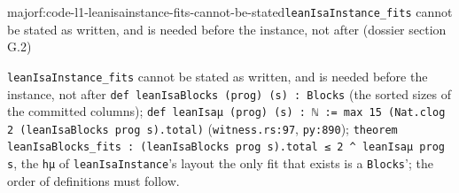 \begin{finding}{major}{f:code-l1-leanisainstance-fits-cannot-be-stated}{\texttt{leanIsaInstance\_\allowbreak{}fits} cannot be stated as written, and is needed before the instance, not after (dossier section G.2)}
\begin{change}{\texttt{leanIsaInstance\_\allowbreak{}fits} cannot be stated as written, and is needed before the instance, not after}
\asproposed \texttt{d\allowbreak{}e\allowbreak{}f\allowbreak{} l\allowbreak{}e\allowbreak{}a\allowbreak{}n\allowbreak{}I\allowbreak{}s\allowbreak{}a\allowbreak{}B\allowbreak{}l\allowbreak{}o\allowbreak{}c\allowbreak{}k\allowbreak{}s\allowbreak{} (\allowbreak{}p\allowbreak{}r\allowbreak{}o\allowbreak{}g\allowbreak{})\allowbreak{} (\allowbreak{}s\allowbreak{})\allowbreak{} :\allowbreak{} B\allowbreak{}l\allowbreak{}o\allowbreak{}c\allowbreak{}k\allowbreak{}s} (the sorted sizes of the committed columns); \texttt{d\allowbreak{}e\allowbreak{}f\allowbreak{} l\allowbreak{}e\allowbreak{}a\allowbreak{}n\allowbreak{}I\allowbreak{}s\allowbreak{}a\allowbreak{}μ\allowbreak{} (\allowbreak{}p\allowbreak{}r\allowbreak{}o\allowbreak{}g\allowbreak{})\allowbreak{} (\allowbreak{}s\allowbreak{})\allowbreak{} :\allowbreak{} ℕ\allowbreak{} :\allowbreak{}=\allowbreak{} m\allowbreak{}a\allowbreak{}x\allowbreak{} 1\allowbreak{}5\allowbreak{} (\allowbreak{}N\allowbreak{}a\allowbreak{}t\allowbreak{}.\allowbreak{}c\allowbreak{}l\allowbreak{}o\allowbreak{}g\allowbreak{} 2\allowbreak{} (\allowbreak{}l\allowbreak{}e\allowbreak{}a\allowbreak{}n\allowbreak{}I\allowbreak{}s\allowbreak{}a\allowbreak{}B\allowbreak{}l\allowbreak{}o\allowbreak{}c\allowbreak{}k\allowbreak{}s\allowbreak{} p\allowbreak{}r\allowbreak{}o\allowbreak{}g\allowbreak{} s\allowbreak{})\allowbreak{}.\allowbreak{}t\allowbreak{}o\allowbreak{}t\allowbreak{}a\allowbreak{}l\allowbreak{})} (\texttt{witness.\allowbreak{}rs:97}, \texttt{py:890}); \texttt{t\allowbreak{}h\allowbreak{}e\allowbreak{}o\allowbreak{}r\allowbreak{}e\allowbreak{}m\allowbreak{} l\allowbreak{}e\allowbreak{}a\allowbreak{}n\allowbreak{}I\allowbreak{}s\allowbreak{}a\allowbreak{}B\allowbreak{}l\allowbreak{}o\allowbreak{}c\allowbreak{}k\allowbreak{}s\allowbreak{}\_\allowbreak{}f\allowbreak{}i\allowbreak{}t\allowbreak{}s\allowbreak{} :\allowbreak{} (\allowbreak{}l\allowbreak{}e\allowbreak{}a\allowbreak{}n\allowbreak{}I\allowbreak{}s\allowbreak{}a\allowbreak{}B\allowbreak{}l\allowbreak{}o\allowbreak{}c\allowbreak{}k\allowbreak{}s\allowbreak{} p\allowbreak{}r\allowbreak{}o\allowbreak{}g\allowbreak{} s\allowbreak{})\allowbreak{}.\allowbreak{}t\allowbreak{}o\allowbreak{}t\allowbreak{}a\allowbreak{}l\allowbreak{} ≤\allowbreak{} 2\allowbreak{} \textasciicircum{}\allowbreak{} l\allowbreak{}e\allowbreak{}a\allowbreak{}n\allowbreak{}I\allowbreak{}s\allowbreak{}a\allowbreak{}μ\allowbreak{} p\allowbreak{}r\allowbreak{}o\allowbreak{}g\allowbreak{} s}, the \texttt{hμ} of \texttt{leanIsaInstance}'s layout
\reason the only fit that exists is a \texttt{Blocks}'; the order of definitions must follow.
\end{change}

\end{finding}


